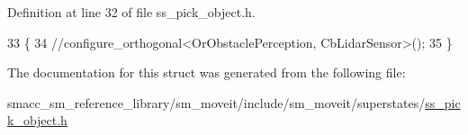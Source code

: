 Definition at line 32 of file ss\+\_\+pick\+\_\+object.\+h.


\begin{DoxyCode}
33     \{
34         \textcolor{comment}{//configure\_orthogonal<OrObstaclePerception, CbLidarSensor>();}
35     \}
\end{DoxyCode}


The documentation for this struct was generated from the following file\+:\begin{DoxyCompactItemize}
\item 
smacc\+\_\+sm\+\_\+reference\+\_\+library/sm\+\_\+moveit/include/sm\+\_\+moveit/superstates/\hyperlink{ss__pick__object_8h}{ss\+\_\+pick\+\_\+object.\+h}\end{DoxyCompactItemize}
